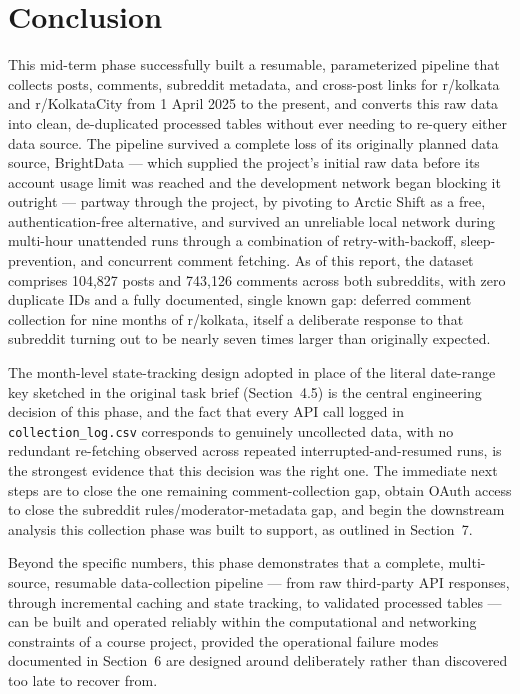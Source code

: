 \documentclass[12pt]{article}
\begin{document}
\section{Conclusion}

This mid-term phase successfully built a resumable, parameterized pipeline that collects posts,
comments, subreddit metadata, and cross-post links for r/kolkata and r/KolkataCity from 1 April
2025 to the present, and converts this raw data into clean, de-duplicated processed tables
without ever needing to re-query either data source. The pipeline survived a complete loss of its
originally planned data source, BrightData — which supplied the project's initial raw data
before its account usage limit was reached and the development network began blocking it
outright — partway through the project, by pivoting to Arctic Shift as a free,
authentication-free alternative, and survived an unreliable local network
during multi-hour unattended runs through a combination of retry-with-backoff, sleep-prevention,
and concurrent comment fetching. As of this report, the dataset comprises 104,827 posts and
743,126 comments across both subreddits, with zero duplicate IDs and a fully documented, single
known gap: deferred comment collection for nine months of r/kolkata, itself a deliberate response
to that subreddit turning out to be nearly seven times larger than originally expected.

The month-level state-tracking design adopted in place of the literal date-range key sketched in
the original task brief (Section~4.5) is the central engineering decision of this phase, and the
fact that every API call logged in \texttt{collection\_log.csv} corresponds to genuinely
uncollected data, with no redundant re-fetching observed across repeated interrupted-and-resumed
runs, is the strongest evidence that this decision was the right one. The immediate next steps
are to close the one remaining comment-collection gap, obtain OAuth access to close the subreddit
rules/moderator-metadata gap, and begin the downstream analysis this collection phase was built
to support, as outlined in Section~7.

Beyond the specific numbers, this phase demonstrates that a complete, multi-source, resumable
data-collection pipeline — from raw third-party API responses, through incremental caching and
state tracking, to validated processed tables — can be built and operated reliably within the
computational and networking constraints of a course project, provided the operational failure
modes documented in Section~6 are designed around deliberately rather than discovered too late
to recover from.
\end{document}

